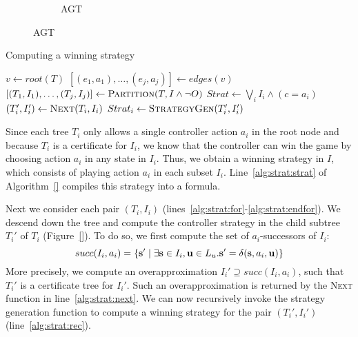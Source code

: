 \begin{figure}
\begin{subfigure}[t]{.4\textwidth}
\begin{minipage}[t][4cm][t]{\textwidth}
        \end{minipage}
        \caption{AGT}
        \label{fig:agt}
    \end{subfigure}
\end{figure}

\begin{algorithm}[t]
   \caption{Computing a winning strategy}\label{alg:strat}
   \begin{algorithmic}[1]
            \State $v \gets root(T)$
            \State $[(e_1, a_1),\ldots,(e_j,a_j)] \gets edges(v)$
            \State $[(T_1,I_1),\ldots,(T_j, I_j)] \gets \textsc{Partition}(T, I \land \neg O)$
            \State $Strat \gets \bigvee_i I_i \land (c = a_i)$\label{alg:strat:strat}
            \label{alg:strat:for}
                \State $(T_i', I_i') \gets \textsc{Next}(T_i, I_i)$\label{alg:strat:next}
                \State $Strat_i \gets \textsc{StrategyGen}(T_i', I_i')$\label{alg:strat:rec}
            \EndFor\label{alg:strat:endfor}
            \State {} \label{alg:strat:return}
        \EndFunction
    \end{algorithmic}
\end{algorithm}


Since each tree $T_i$ only allows a single controller action $a_i$
in the root node and because $T_i$ is a certificate for $I_i$, we
know that the controller can win the game by choosing action $a_i$
in any state in $I_i$.  Thus, we obtain a winning strategy in $I$,
which consists of playing action $a_i$ in each subset $I_i$.  Line~\ref{alg:strat:strat}
of Algorithm~\ref{} compiles this strategy into a formula.

Next we consider each pair $(T_i, I_i)$
(lines~\ref{alg:strat:for}-\ref{alg:strat:endfor}). We descend
down the tree and compute the controller strategy in the child
subtree $T_i'$ of $T_i$ (Figure~\ref{}).  To do so, we first
compute the set of $a_i$-successors of $I_i$:
\begin{equation}\label{eq:succ}
    succ(I_i, a_i) = \{\mathbf{s}' \mid \exists \mathbf{s}\in I_i,\mathbf{u}\in L_u. \mathbf{s}' = \delta(\mathbf{s}, a_i, \mathbf{u})\}
\end{equation}
More precisely, we compute an overapproximation
$I_i'\supseteq succ(I_i, a_i)$, such that $T_i'$ is a certificate
tree for $I_i'$.  Such an overapproximation is returned by the
\textsc{Next} function in line~\ref{alg:strat:next}.  We can now
recursively invoke the strategy generation function to compute a
winning strategy for the pair $(T_i', I_i')$
(line~\ref{alg:strat:rec}).

